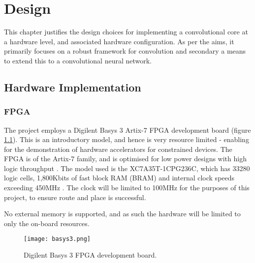 
\chapter[Design]{Design}
\label{chap:Design}	%
\pagestyle{headings}

This chapter justifies the design choices for implementing a convolutional core at a hardware level, and associated hardware configuration.
As per the aims, it primarily focuses on a robust framework for convolution and secondary a means to extend this to a convolutional neural network.

\section{Hardware Implementation}
\subsection{FPGA}
The project employs a Digilent Basys 3 Artix-7 FPGA development board (figure \ref{fig:dev_board}).
This is an introductory model, and hence is very resource limited - enabling for the demonstration of hardware accelerators for constrained devices.
The FPGA is of the Artix-7 family, and is optimised for low power designs with high logic throughput \cite{Xilinx7SeriesDatasheet}. 
The model used is the XC7A35T-1CPG236C, which has 33280 logic cells, 1,800Kbits of fast block RAM (BRAM) and internal clock speeds exceeding 450MHz \cite{basys}.
The clock will be limited to 100MHz for the purposes of this project, to ensure route and place is successful.

No external memory is supported, and as such the hardware will be limited to only the on-board resources.

\begin{figure}[h!]
    \centering
    \texttt{[image: basys3.png]}
    \caption[Digilent Basys 3 FPGA development board]{Digilent Basys 3 FPGA development board.}
    \label{fig:dev_board}
\end{figure}

